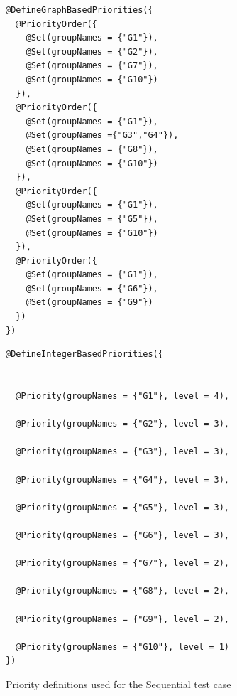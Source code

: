 \documentclass[11pt]{report}
\begin{document}
\begin{figure}[!ht]
	\lstset{language=java, numberstyle=\tiny, stepnumber=1, numbersep=5pt, basicstyle=\footnotesize}
	\begin{minipage}{0.41\textwidth}
	\begin{lstlisting}[frame=single]
@DefineGraphBasedPriorities({
  @PriorityOrder({
    @Set(groupNames = {"G1"}),
    @Set(groupNames = {"G2"}),
    @Set(groupNames = {"G7"}),
    @Set(groupNames = {"G10"})
  }),
  @PriorityOrder({
    @Set(groupNames = {"G1"}),
    @Set(groupNames ={"G3","G4"}),
    @Set(groupNames = {"G8"}),
    @Set(groupNames = {"G10"})
  }),
  @PriorityOrder({
    @Set(groupNames = {"G1"}),
    @Set(groupNames = {"G5"}),
    @Set(groupNames = {"G10"})
  }),
  @PriorityOrder({
    @Set(groupNames = {"G1"}),
    @Set(groupNames = {"G6"}),
    @Set(groupNames = {"G9"})
  })
})
 	\end{lstlisting}
 	\end{minipage}
 	\nointerlineskip
	\begin{minipage}{0.57\textwidth}
	\begin{lstlisting}[frame=single]
@DefineIntegerBasedPriorities({


  @Priority(groupNames = {"G1"}, level = 4),
  
  @Priority(groupNames = {"G2"}, level = 3),
  
  @Priority(groupNames = {"G3"}, level = 3),
  
  @Priority(groupNames = {"G4"}, level = 3),
  
  @Priority(groupNames = {"G5"}, level = 3),
  
  @Priority(groupNames = {"G6"}, level = 3),
  
  @Priority(groupNames = {"G7"}, level = 2),
  
  @Priority(groupNames = {"G8"}, level = 2),
  
  @Priority(groupNames = {"G9"}, level = 2),
  
  @Priority(groupNames = {"G10"}, level = 1)
})
 	\end{lstlisting}
 	\end{minipage}	
	\caption{Priority definitions used for the Sequential test case}
	\label{fig:sequential-decl}
\end{figure}
\end{document}
